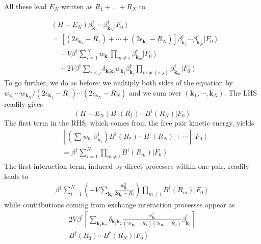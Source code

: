 \documentclass[epj]{svjour}
\newcommand{\vk}{\ensuremath{\mathbf{k}}}
\begin{document}
All these lead $E_N$ written as $R_1+...+R_N$ to


\begin{equation}\label{eq:HN2}
\begin{split}
&(H-E_N)\beta^{\dagger}_{\mathbf{k} _1}\cdots\beta^{\dagger}_{\mathbf{k}
_N}\left|F_0\right> \\
&=[(2\epsilon_{\vk_1}-R_1)+\cdots+(2\epsilon_{\vk_2}-R_N)]\beta^\dagger_{\vk_1}\cdots\beta^\dagger_{\vk_N}\left|F_0\right>  \\
&\quad-V\beta^{\dagger}\sum^N_{i=1}w_{\mathbf{k}_i}\prod_{m\neq{}i}\beta^{\dagger}_{\mathbf{k} _m} \left|F_0\right>  \\
&\quad+2V\beta^\dagger\sum_{i<j}\delta_{\vk_i\vk_j}w_{\vk_j}\beta^\dagger_{\vk_j}\prod_{m\neq(i,j)}\beta^{\dagger}_{\mathbf{k} _m} \left|F_0\right>  
\end{split}
\end{equation}
To go further, we do as before: we multiply both sides of the equation by $w_{\vk_1}\cdots{}w_{\vk_N}/(2\epsilon_{\vk_1}-R_1)\cdots(2\epsilon_{\vk_N}-R_N)$ and we sum over $(\vk_1,\cdots,\vk_N)$.  
The LHS readily gives
\begin{equation}
(H-E _N)B^{\dagger} (R_1)\cdots{}B^{\dagger}(R_N)\left|F_0\right> 
\end{equation}
The first term in the RHS, which comes from the free pair kinetic energy, yields
\begin{equation}
\begin{split}
&[(\sum{}w_{\vk_1}\beta^\dagger_{\vk_1})B^\dagger(R_2)\cdots{}B^\dagger(R_N)+\cdots]\left|F_0\right>\\
&=\beta^\dagger\sum_{i=1}^N\prod_{m\neq{i}}B^\dagger(R_m)\left|F_0\right> 
\end{split}
\end{equation}
The first interaction term, induced by direct processes within one pair, readily leads to 
\begin{equation}
\begin{split}
\beta^\dagger\sum_{i=1}^N(-V\sum_{\vk_i}\frac{w_{\mathbf{k} _i}^2}{2\epsilon_{\mathbf{k} _i}-R_i})\prod_{m\neq{i}}B^\dagger(R_m)\left|F_0\right> 
\end{split}
\end{equation}
while contributions coming from exchange interaction processes appear as
\begin{equation}
\begin{split}
2V\beta^\dagger\left[\sum_{\vk_1\vk_2}\delta_{\vk_1\vk_2}\frac{w^3_{\mathbf{k} _1}}{(2\epsilon_{\mathbf{k} _1}-R_1)(2\epsilon_{\mathbf{k} _2}-R_2)}\beta^\dagger_{\vk_1}\right]\\B^\dagger(R_3)\cdots{}B^\dagger(R_N)\left|F_0\right> 
\end{split}
\end{equation}
\end{document}
